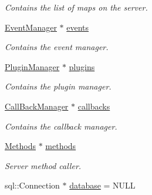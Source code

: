 \begin{DoxyCompactItemize}
\begin{DoxyCompactList}\small\item\em Contains the list of maps on the server. \end{DoxyCompactList}\item 
\hypertarget{classManiaPP_a326ab543ab98eefcba8a4b616e794b96}{\hyperlink{classEventManager}{Event\-Manager} $\ast$ \hyperlink{classManiaPP_a326ab543ab98eefcba8a4b616e794b96}{events}}\label{classManiaPP_a326ab543ab98eefcba8a4b616e794b96}

\begin{DoxyCompactList}\small\item\em Contains the event manager. \end{DoxyCompactList}\item 
\hypertarget{classManiaPP_a199f7d80431e7f13e52e6010347f644a}{\hyperlink{classPluginManager}{Plugin\-Manager} $\ast$ \hyperlink{classManiaPP_a199f7d80431e7f13e52e6010347f644a}{plugins}}\label{classManiaPP_a199f7d80431e7f13e52e6010347f644a}

\begin{DoxyCompactList}\small\item\em Contains the plugin manager. \end{DoxyCompactList}\item 
\hypertarget{classManiaPP_af468d4b6eea93fd836950551eb7d3a01}{\hyperlink{classCallBackManager}{Call\-Back\-Manager} $\ast$ \hyperlink{classManiaPP_af468d4b6eea93fd836950551eb7d3a01}{callbacks}}\label{classManiaPP_af468d4b6eea93fd836950551eb7d3a01}

\begin{DoxyCompactList}\small\item\em Contains the callback manager. \end{DoxyCompactList}\item 
\hypertarget{classManiaPP_a48cb1ddf328d18361417986fe8ab069c}{\hyperlink{classMethods}{Methods} $\ast$ \hyperlink{classManiaPP_a48cb1ddf328d18361417986fe8ab069c}{methods}}\label{classManiaPP_a48cb1ddf328d18361417986fe8ab069c}

\begin{DoxyCompactList}\small\item\em Server method caller. \end{DoxyCompactList}\item 
\hypertarget{classManiaPP_ae2d403d9168ed624d1f877c85b3b38c7}{sql\-::\-Connection $\ast$ \hyperlink{classManiaPP_ae2d403d9168ed624d1f877c85b3b38c7}{database} = N\-U\-L\-L}\label{classManiaPP_ae2d403d9168ed624d1f877c85b3b38c7}


\end{DoxyCompactItemize}
